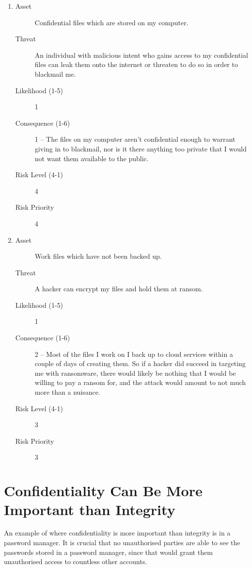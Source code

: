 \documentclass{article}
\begin{document}
\begin{enumerate}
	\item
		\begin{description}
			\item[Asset] Confidential files which are stored on my computer.
			\item[Threat] An individual with malicious intent who gains access to my confidential files can leak them onto the internet or threaten to do so in order to blackmail me.
			\item[Likelihood (1-5)] 1
			\item[Consequence (1-6)] 1 -- The files on my computer aren't confidential enough to warrant giving in to blackmail, nor is it there anything too private that I would not want them available to the public.
			\item[Risk Level (4-1)] 4
			\item[Risk Priority] 4
		\end{description}

	\item
		\begin{description}
			\item[Asset] Work files which have not been backed up.
			\item[Threat] A hacker can encrypt my files and hold them at ransom.
			\item[Likelihood (1-5)] 1
			\item[Consequence (1-6)] 2 -- Most of the files I work on I back up to cloud services within a couple of days of creating them. So if a hacker did succeed in targeting me with ransomware, there would likely be nothing that I would be willing to pay a ransom for, and the attack would amount to not much more than a nuisance.
			\item[Risk Level (4-1)] 3
			\item[Risk Priority] 3
		\end{description}
\end{enumerate}

\section{Confidentiality Can Be More Important than Integrity}

An example of where confidentiality is more important than integrity is in a password manager. It is crucial that no unauthorised parties are able to see the passwords stored in a password manager, since that would grant them unauthorised access to countless other accounts.
\end{document}
